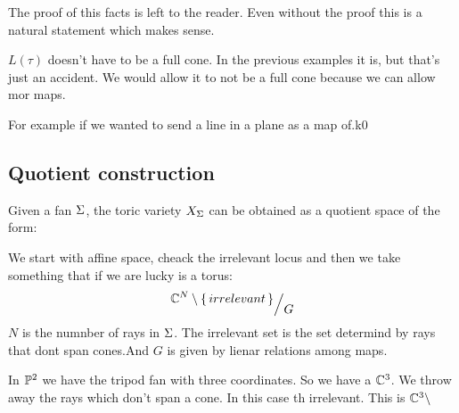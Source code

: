 \documentclass[12pt]{memoir}
\begin{document}
The proof of this facts is left to the reader. Even without the proof this is a natural statement which makes sense.
\begin{significant}
    $L(\tau)$ doesn't have to be a full cone. In the previous examples it is, but that's just an accident. We would allow it to not be a full cone because we can allow mor maps.
\end{significant}
For example if we wanted to send a line in a plane as a map of.k0

\subsection{Quotient construction}

Given a fan $\Sigma$, the toric variety $X_\Sigma$ can be obtained as a quotient space of the form:\par 
We start with affine space, cheack the irrelevant locus and then we take something that if we are lucky is a torus:
$$\quot{\bC^N\less\set{irrelevant}}{G}$$
$N$ is the numnber of rays in $\Sigma$. The irrelevant set is the set determind by rays that dont span cones.And $G$ is given by lienar relations among maps. 

\begin{Ex}
In $\mathbb{P}^2$  we have the tripod fan with three coordinates. So we have a $\mathbb{C}^3$. We throw away the rays which don't span a cone. In this case th irrelevant. This is $\mathbb{C}^3\setminus$ 
\end{Ex}

\ifx\nextra\undefined
\printindex
\else\fi
\nocite{*}


\end{document}
